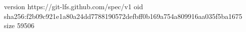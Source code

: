 version https://git-lfs.github.com/spec/v1
oid sha256:f2b09c921e1a80a24dd7788190572defbff0b169a754a809916aa035f5ba1675
size 59506
